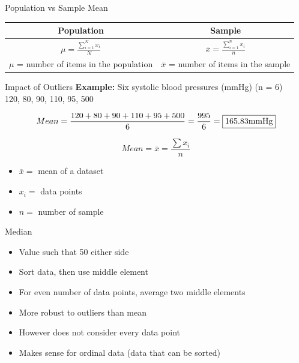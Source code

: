 \documentclass[10pt,dvipsnames, aspectratio=169]{beamer}
\begin{document}
\begin{frame}[t]{Population vs Sample Mean}
	\begin{center}
		\begin{tabular}{|c|c|} 
			\hline 
			Population & Sample \\ 
			\hline 
			$\mu  = \frac{\sum_{i=1}^{N} x_i }{N}$ & $\overline{x}  = 
			\frac{\sum_{i=1}^{n} 
				x_i }{n}$ \\
			\hline
			$\mu$ = number of items in the population  & $\overline{x}$ = 
			number of 
			items in the sample \\ 
			\hline 
		\end{tabular}
	\end{center}
\end{frame}


\begin{frame}[t]{Impact of Outliers}
	\textbf{Example:} Six systolic blood pressures (mmHg) (n = 6) \\ 
	120, 80, 90, 110, 95, 500
	
	$$
	Mean = 
	\frac{120+80+90+110+95+500}{6}
	= \frac{995}{6}
	= \fbox{165.83mmHg}
	$$
	
	$$
	Mean = \overline{x}  = \frac{\sum x_i }{n}
	$$
	
	\begin{itemize}
		\item $	\overline{x} = $ mean of a dataset
		\item $	x_i =$ data points 
		\item $	n =$ number of sample 
	\end{itemize}
\end{frame}



\begin{frame}[t]{Median}
	\begin{itemize}
		\item Value such that 50%
		either side
		\item Sort data, then use middle element
		\item For even number of data points,
		average two middle elements
		\item More robust to outliers than mean
		\item However does not consider every
		data point
		\item Makes sense for ordinal data (data
		that can be sorted)
	\end{itemize}
\end{frame}
\end{document}
